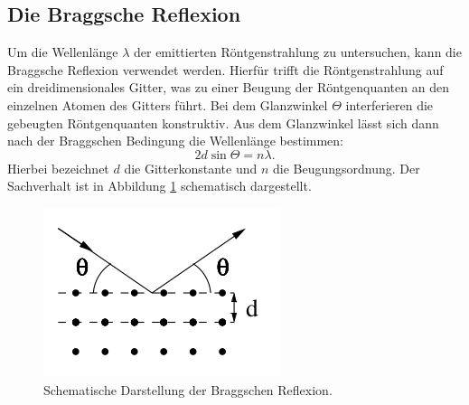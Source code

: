 \subsection{Die Braggsche Reflexion}
Um die Wellenlänge $\lambda$ der emittierten Röntgenstrahlung zu untersuchen,
kann die Braggsche Reflexion verwendet werden. Hierfür trifft die Röntgenstrahlung
auf ein dreidimensionales Gitter, was zu einer Beugung der Röntgenquanten
an den einzelnen Atomen des Gitters führt.  Bei dem Glanzwinkel $\Theta$ interferieren
die gebeugten Röntgenquanten konstruktiv. Aus dem Glanzwinkel lässt sich dann
nach der Braggschen Bedingung die Wellenlänge bestimmen:
\begin{equation}
  2 d \sin \Theta = n \lambda.
  \label{eqn:braggtheorie}
\end{equation}
Hierbei bezeichnet $d$ die Gitterkonstante und $n$ die Beugungsordnung. Der
Sachverhalt ist in Abbildung \ref{fig:braggtheorie} schematisch dargestellt.
\begin{figure}[H]
  \centering
  \includegraphics[scale=0.5]{"content/bragg.png"}
  \caption{Schematische Darstellung der Braggschen Reflexion. \cite{AP01}}
  \label{fig:braggtheorie}
\end{figure}
